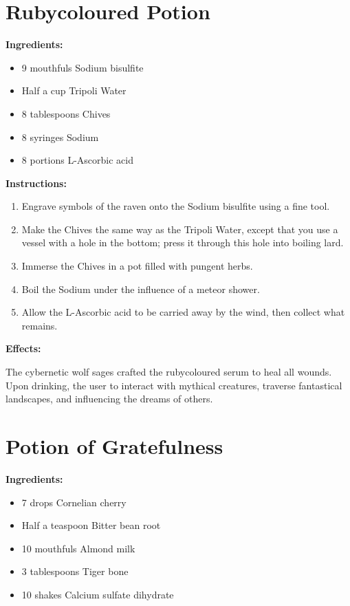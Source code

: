 \documentclass{article}
\begin{document}
\newpage
\section*{Rubycoloured Potion}

\textbf{Ingredients:}

\begin{itemize}
  \item 9 mouthfuls Sodium bisulfite
  \item Half a cup Tripoli Water
  \item 8 tablespoons Chives
  \item 8 syringes Sodium
  \item 8 portions L-Ascorbic acid
\end{itemize}

\textbf{Instructions:}

\begin{enumerate}
  \item Engrave symbols of the raven onto the Sodium bisulfite using a fine tool.
  \item Make the Chives the same way as the Tripoli Water, except that you use a vessel with a hole in the bottom; press it through this hole into boiling lard.
  \item Immerse the Chives in a pot filled with pungent herbs.
  \item Boil the Sodium under the influence of a meteor shower.
  \item Allow the L-Ascorbic acid to be carried away by the wind, then collect what remains.
\end{enumerate}

\textbf{Effects:}

The cybernetic wolf sages crafted the rubycoloured serum to heal all wounds. Upon drinking, the user to interact with mythical creatures, traverse fantastical landscapes, and influencing the dreams of others.

\newpage
\section*{Potion of Gratefulness}

\textbf{Ingredients:}

\begin{itemize}
  \item 7 drops Cornelian cherry
  \item Half a teaspoon Bitter bean root
  \item 10 mouthfuls Almond milk
  \item 3 tablespoons Tiger bone
  \item 10 shakes Calcium sulfate dihydrate
\end{itemize}
\end{document}
